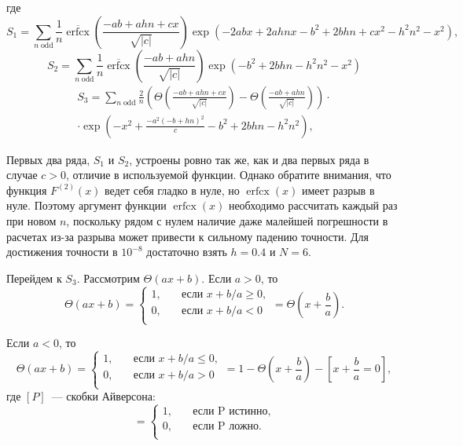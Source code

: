 \documentclass[12pt]{article}
\def\FV{F^{(2)}}
\begin{document}
где
\begin{equation}
    S_1 = \sum\limits_{n \; \text{odd}} \frac{1}{n} \overline{\operatorname{erfcx}} \left(\frac{- a b + a h n + c x}{\sqrt{|c|}}\right) \exp\left(- 2 a b x + 2 a h n x - b^{2} + 2 b h n + c x^{2} - h^{2} n^{2} - x^{2}\right),
\end{equation}
\begin{equation}
    S_2 = \sum\limits_{n \; \text{odd}} \frac{1}{n} \overline{\operatorname{erfcx}} \left(\frac{-ab + ahn}{\sqrt{|c|}}\right) \exp\left(- b^{2} + 2 b h n - h^{2} n^{2} - x^{2}\right)
\end{equation}
\begin{multline}
    S_3 = \sum\limits_{n \; \text{odd}} \frac{2}{n} \left(\Theta\left(\frac{- a b + a h n + c x}{\sqrt{|c|}}\right) - \Theta\left(\frac{-ab + ahn}{\sqrt{|c|}}\right)\right)\cdot\\\cdot\exp\left(- x^{2} + \frac{- a^{2} \left(- b + h n\right)^{2}}{c} - b^{2} + 2 b h n - h^{2} n^{2}\right),
\end{multline}

Первых два ряда, $S_1$ и $S_2$, устроены ровно так же, как и два первых ряда в случае $c > 0$, отличие в используемой функции. Однако обратите внимания, что функция $\FV(x)$ ведет себя гладко в нуле, но $\operatorname{erfcx}(x)$ имеет разрыв в нуле. Поэтому аргумент функции $\operatorname{erfcx}(x)$ необходимо рассчитать каждый раз при новом $n$, поскольку рядом с нулем наличие даже малейшей погрешности в расчетах из-за разрыва может привести к сильному падению точности. Для достижения точности в $10^{-8}$ достаточно взять $h = 0.4$ и $N=6$.

Перейдем к $S_3$. Рассмотрим $\Theta(ax+b)$. Если $a > 0$, то
\begin{equation}
    \Theta(ax+b) = 
    \begin{cases}
        1,  \quad &\text{если $x + b/a\ge 0$}, \\
        0, \quad &\text{если $x + b/a < 0$} \\
    \end{cases}   
    = \Theta\left(x+\frac{b}{a}\right).
\end{equation}

Если $a < 0$, то 
\begin{equation}
    \Theta(ax+b) = 
    \begin{cases}
        1,  \quad &\text{если $x + b/a \le 0$}, \\
        0, \quad &\text{если $x + b/a > 0$} \\
    \end{cases}   
    = 1 - \Theta\left(x+\frac{b}{a}\right) - \left[x+\frac{b}{a} = 0\right],
\end{equation}
где $[P]$~--- скобки Айверсона:
\begin{equation}
    [P] = 
    \begin{cases}
        1, \quad &\text{если P истинно}, \\
        0, \quad &\text{если P ложно}. \\
    \end{cases}
\end{equation}
\end{document}
